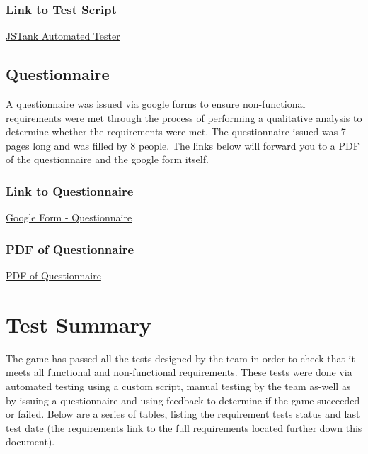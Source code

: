 \documentclass{article}
\begin{document}
 \subsubsection {Link to Test Script}
\hspace{10 mm}
{\color{blue}   \href{http://pavipath.com/JSTanks/Testing/Test.html}{JSTank Automated Tester}}


\subsection{Questionnaire}
A questionnaire was issued via google forms to ensure non-functional requirements 
were met through the process of performing a qualitative analysis to determine 
whether the requirements were met. The questionnaire issued was 7 pages long 
and was filled by 8 people. The links below will forward you to a PDF of the 
questionnaire and the google form itself.

 \subsubsection {Link to Questionnaire}
\hspace{10 mm}
{\color{blue}   \href{http://sl.pavipath.com/2gJSSurvey}{Google Form - Questionnaire}}
  
\subsubsection {PDF of Questionnaire}
\hspace{10 mm}
{\color{blue}  \href{file:///../../ReferenceMaterial/questionnaire.pdf}{PDF of Questionnaire}}



\section{Test Summary}
The game has passed all the tests designed by the team in order to check that it meets all 
functional and non-functional requirements. These tests were done via automated testing 
using a custom script, manual testing by the team as-well as by issuing a questionnaire 
and using feedback to determine if the game succeeded or failed. Below are a series of
tables, listing the requirement tests status and last test date (the requirements link to the 
full requirements located further down this document).    
\end{document}
